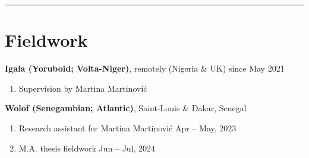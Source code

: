 \documentclass[margin,line]{resume}
\begin{document}
\begin{resume}
\begin{comment}
	\textbf{Junior Developer}, \href{https://gls-canada.com/en/dicom/corp/home}{GLS (\textit{fka} Dicom)}, Montr\'{e}al \hfill Jan -- May 2019
	\begin{enumerate}[-, leftmargin=1em, topsep=2pt]
		\item[] Worked on \href{https://gls-canada.com/en/dicom/about-us/news/dicom-launches-smart4-shipping}{smart4 shipping platform} back-end
	\end{enumerate}
	\end{comment}

	\vspace{-0.9em}\rule{\textwidth}{0.4pt}


	\begin{comment}
	\section{\mysidestyle Teaching}

	\href{https://www.mcgill.ca/study/2023-2024/courses/ling-410}{LING 410 - Structure of Wolof} undergraduate class for Martina Martinović.\\
	McGill University.
	\hfill Feb 28 2024

	\vspace{-0.6em}\rule{\textwidth}{0.4pt}
	\end{comment}


		\vspace{-0.5em}

		\section{\mysidestyle Fieldwork}

		\textbf{Igala (Yoruboid; Volta-Niger)}, remotely (Nigeria \& UK) \hfill since May 2021
		\begin{enumerate}[-, leftmargin=1em, topsep=2pt]
			\item[] Supervision by Martina Martinović
		\end{enumerate}
	
	
		\textbf{Wolof (Senegambian; Atlantic)}, Saint-Louis \& Dakar, Senegal %
		\begin{enumerate}[-, leftmargin=1em, topsep=2pt]
			\item[] Research assistant for Martina Martinović \hfill Apr -- May, 2023
			\item[] M.A. thesis fieldwork \hfill Jun -- Jul, 2024
		\end{enumerate}
	

\end{resume}
\end{document}
